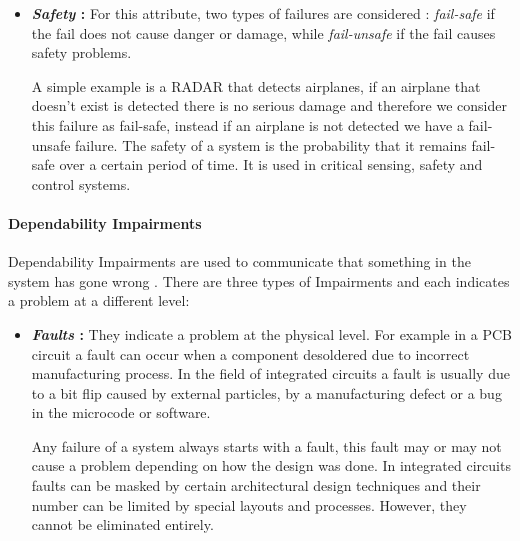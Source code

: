{{{{\begin{itemize}
					Availability is usually expressed as a percentage or by the downtime at a certain instant. For example, a system with Availability of 99.999\% will have a mean downtime of 5 minutes over a year. The common expression for Availability is:
					\begin{equation}
						Availability = \dfrac{MTTF}{MTTF + MTTR} = \frac{MTTF}{MTBF} 
					\end{equation}
					
					\item \textbf{\textit{Safety} : } For this attribute, two types of failures are considered : \textit{fail-safe} if the fail does not cause danger or damage, while \textit{fail-unsafe} if the fail causes safety problems.
					
					A simple example is a RADAR that detects airplanes, if an airplane that doesn't exist is detected there is no serious damage and therefore we consider this failure as fail-safe, instead if an airplane is not detected we have a fail-unsafe failure. The safety of a system is the probability that it remains fail-safe over a certain period of time. It is used in critical sensing, safety and control systems. 
				\end{itemize}	
				
			} %
			\paragraph{Dependability Impairments}{
				Dependability Impairments are used to communicate that something in the system has gone wrong . There are three types of Impairments and each indicates a problem at a different level:
				\begin{itemize}
					\item \textbf{\textit{Faults} : } They indicate a problem at the physical level. For example in a PCB circuit a fault can occur when a component desoldered due to incorrect manufacturing process. In the field of integrated circuits a fault is usually due to a bit flip caused by external particles, by a manufacturing defect or a bug in the microcode or software. 
					
					Any failure of a system always starts with a fault, this fault may or may not cause a problem depending on how the design was done. In integrated circuits faults can be masked by certain architectural design techniques and their number can be limited by special layouts and processes. However, they cannot be eliminated entirely.


\end{itemize}}}}}
